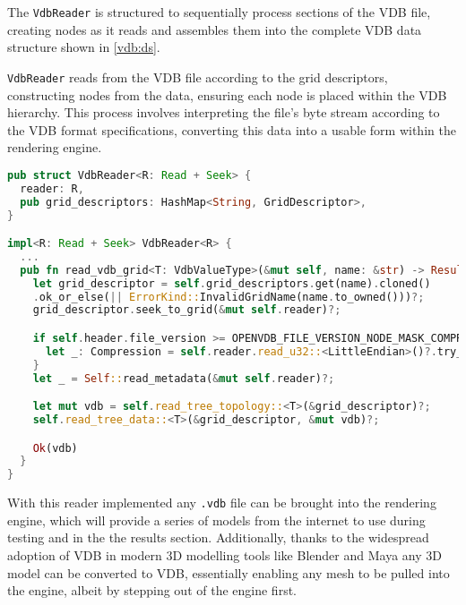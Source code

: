 The \texttt{VdbReader} is structured to sequentially process sections of the VDB file, creating nodes as it reads and assembles them into the complete VDB data structure shown in \cref{vdb:ds}.

\texttt{VdbReader} reads from the VDB file according to the grid descriptors, constructing nodes from the data, ensuring each node is placed within the VDB hierarchy. This process involves interpreting the file's byte stream according to the VDB format specifications, converting this data into a usable form within the rendering engine.

\begin{lstlisting}[language=rust, captionpos=b, caption={
    \texttt{VdbReader} definition: \texttt{reader} is file stream handler, \texttt{grid\_descriptors} hold the metadata given in \cref{file:meta}.
    \texttt{VdbReader} implementation: The method \texttt{read\_vdb\_grid} is shown, which is called after the file header is handled, and returns a VDB is the file contents matched the expectations from the header, if not it returns an error.
  }, label={vdb:read}]
pub struct VdbReader<R: Read + Seek> {
  reader: R,
  pub grid_descriptors: HashMap<String, GridDescriptor>,
}

impl<R: Read + Seek> VdbReader<R> {
  ...
  pub fn read_vdb_grid<T: VdbValueType>(&mut self, name: &str) -> Result<VDB<T>> {
    let grid_descriptor = self.grid_descriptors.get(name).cloned()
    .ok_or_else(|| ErrorKind::InvalidGridName(name.to_owned()))?;
    grid_descriptor.seek_to_grid(&mut self.reader)?;

    if self.header.file_version >= OPENVDB_FILE_VERSION_NODE_MASK_COMPRESSION {
      let _: Compression = self.reader.read_u32::<LittleEndian>()?.try_into()?;
    }
    let _ = Self::read_metadata(&mut self.reader)?;

    let mut vdb = self.read_tree_topology::<T>(&grid_descriptor)?;
    self.read_tree_data::<T>(&grid_descriptor, &mut vdb)?;

    Ok(vdb)
  }
}
\end{lstlisting}

With this reader implemented any \texttt{.vdb} file can be brought into the rendering engine, which will provide a series of models from the internet to use during testing and in the the results section. Additionally, thanks to the widespread adoption of VDB in modern 3D modelling tools like Blender and Maya any 3D model can be converted to VDB, essentially enabling any mesh to be pulled into the engine, albeit by stepping out of the engine first.

